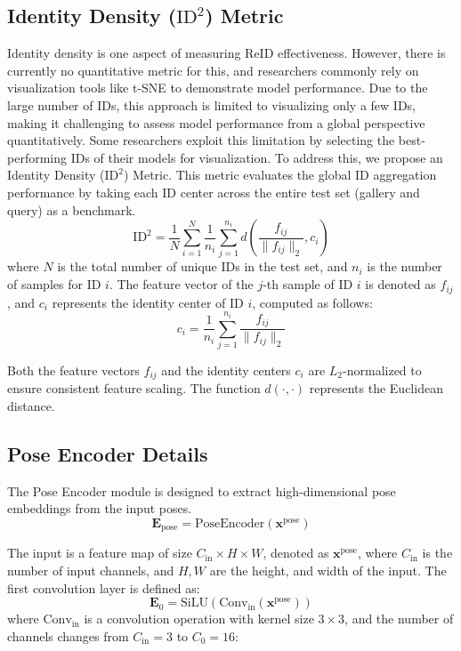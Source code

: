 \subsection{Identity Density ($\text{ID}^2$) Metric}
Identity density is one aspect of measuring ReID effectiveness. However, there is currently no quantitative metric for this, and researchers commonly rely on visualization tools like t-SNE to demonstrate model performance. Due to the large number of IDs, this approach is limited to visualizing only a few IDs, making it challenging to assess model performance from a global perspective quantitatively. Some researchers exploit this limitation by selecting the best-performing IDs of their models for visualization. To address this, we propose an Identity Density ($\text{ID}^2$) Metric. This metric evaluates the global ID aggregation performance by taking each ID center across the entire test set (gallery and query) as a benchmark.
\begin{equation}
\text{ID}^2 = \frac{1}{N} \sum_{i=1}^{N} \frac{1}{n_i} \sum_{j=1}^{n_i} d\left( \frac{f_{ij}}{\|f_{ij}\|_2}, c_i \right)
\end{equation}
where \( N \) is the total number of unique IDs in the test set, and \( n_i \) is the number of samples for ID \( i \). The feature vector of the \( j \)-th sample of ID \( i \) is denoted as \( f_{ij} \), and \( c_i \) represents the identity center of ID \( i \), computed as follows:
\begin{equation}
c_i = \frac{1}{n_i} \sum_{j=1}^{n_i} \frac{f_{ij}}{\|f_{ij}\|_2}
\end{equation}

Both the feature vectors \( f_{ij} \) and the identity centers \( c_i \) are \( L_2 \)-normalized to ensure consistent feature scaling. The function \( d(\cdot, \cdot) \) represents the Euclidean distance. 


\subsection{Pose Encoder Details}

The Pose Encoder module is designed to extract high-dimensional pose embeddings from the input poses. 
\begin{equation}
\mathbf{E}_{\text{pose}} = \text{PoseEncoder}(\mathbf{x}^{\text{pose}})
\end{equation}

The input is a feature map of size \(C_{\text{in}} \times H \times W\), denoted as \( \mathbf{x}^{\text{pose}} \), 
where \(C_{\text{in}}\) is the number of input channels, and \(H, W\) are the height, and width of the input. 
The first convolution layer is defined as:
\begin{equation}
\mathbf{E}_0 = \text{SiLU}(\text{Conv}_{\text{in}}(\mathbf{x}^{\text{pose}}))
\end{equation}
where \( \text{Conv}_{\text{in}} \) is a convolution operation with kernel size \(3 \times 3\), 
and the number of channels changes from \( C_{\text{in}} =3\) to \( C_0 =16\):

